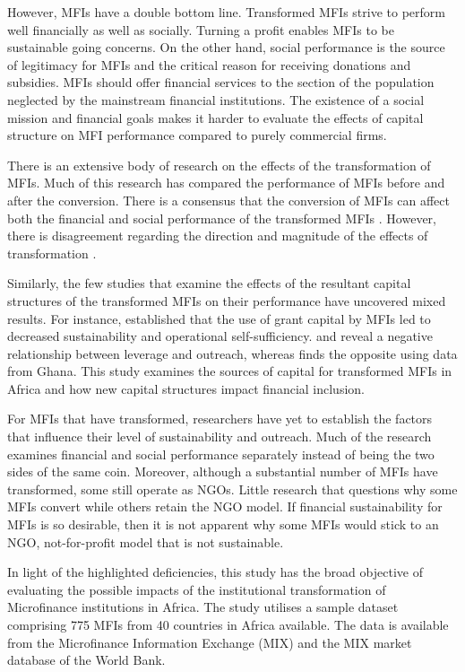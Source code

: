 \documentclass[a4paper, nobind]{templates/ociamthesis}
\begin{document}
However, MFIs have a double bottom line. Transformed MFIs strive to perform well financially as well as socially. Turning a profit enables MFIs to be sustainable going concerns. On the other hand, social performance is the source of legitimacy for MFIs and the critical reason for receiving donations and subsidies. MFIs should offer financial services to the section of the population neglected by the mainstream financial institutions. The existence of a social mission and financial goals makes it harder to evaluate the effects of capital structure on MFI performance compared to purely commercial firms.

There is an extensive body of research on the effects of the transformation of MFIs. Much of this research has compared the performance of MFIs before and after the conversion. There is a consensus that the conversion of MFIs can affect both the financial and social performance of the transformed MFIs \autocite{chahine2010social,mersland2010microfinance}. However, there is disagreement regarding the direction and magnitude of the effects of transformation \autocite{mersland2010microfinance,d2017ngos}.

Similarly, the few studies that examine the effects of the resultant capital structures of the transformed MFIs on their performance have uncovered mixed results. For instance, \textcite{bogan2012capital} established that the use of grant capital by MFIs led to decreased sustainability and operational self-sufficiency. \textcite{hoque2011commercialization} and \textcite{kar2012does} reveal a negative relationship between leverage and outreach, whereas \textcite{kyereboah2007determinants} finds the opposite using data from Ghana. This study examines the sources of capital for transformed MFIs in Africa and how new capital structures impact financial inclusion.

For MFIs that have transformed, researchers have yet to establish the factors that influence their level of sustainability and outreach. Much of the research examines financial and social performance separately instead of being the two sides of the same coin. Moreover, although a substantial number of MFIs have transformed, some still operate as NGOs. Little research that questions why some MFIs convert while others retain the NGO model. If financial sustainability for MFIs is so desirable, then it is not apparent why some MFIs would stick to an NGO, not-for-profit model that is not sustainable.

In light of the highlighted deficiencies, this study has the broad objective of evaluating the possible impacts of the institutional transformation of Microfinance institutions in Africa. The study utilises a sample dataset comprising 775 MFIs from 40 countries in Africa available. The data is available from the Microfinance Information Exchange (MIX) and the MIX market database of the World Bank.
\end{document}
